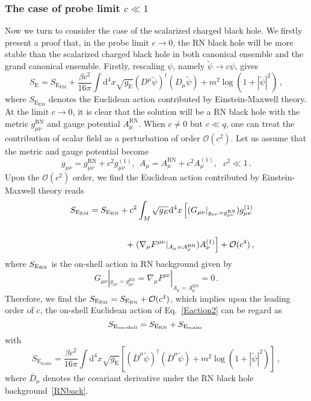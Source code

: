 \documentclass[pr, twocolumn, preprintnumbers, showpacs,footnoteadded, superscriptaddress,nofootinbib,longbibliography]{revtex4-1}
\newcommand{\td}{\mathrm{d}}
\begin{document}
\subsubsection{The case of probe limit $c \ll 1$}
Now we turn to consider the case of the scalarized charged black hole. We firstly present a proof that, in the probe limit $c \to 0$, the RN black hole will be more stable than the scalarized charged black hole in both canonical ensemble and the grand canonical ensemble. Firstly, rescaling $\psi$, namely $\tilde{\psi} \to c \psi$, gives
%
\begin{equation}\label{Eaction2}
 S_\text{E}=S_{\text{E}_{\text{EM}}}+\frac{\beta c^2}{16\pi}\int \td^4 x \sqrt{g_{\text{E}}} (D^ \mu \tilde{\psi})^{\dag}(D_\mu \tilde{\psi})+m^2 \log(1+|\tilde{\psi}|^2) \, ,
\end{equation}
%
where $S_{\text{E}_{\text{EM}}}$ denotes the Euclidean action contributed by Einstein-Maxwell theory.  At the limit $c \to 0$, it is clear that the solution will be a RN black hole with the metric $g_{\mu\nu}^{\text{RN}}$ and gauge potential $A_{\mu}^{\text{RN}}$. When $c\neq 0$ but $c\ll q$, one can treat the contribution of scalar field as a perturbation of order $\mathcal{O}(c^2)$. Let us assume that the metric and gauge potential become
%
\begin{equation}\label{metricas1}
  g_{\mu\nu}=g_{\mu\nu}^{\text{RN}}+c^2g_{\mu\nu}^{(1)},~~A_\mu=A_{\mu}^{\text{RN}}+c^2A_\mu^{(1)},~~~c^2\ll1\,.
\end{equation}
%
Upon the $\mathcal{O}(c^2)$ order, we find the Euclidean action contributed by Einstein-Maxwell theory reads
%
\begin{eqnarray}\label{actems1}
&& S_{\text{E}_{\text{EM}}}=S_{\text{E}_{\rm RN}}  + c^2\int_{M}\sqrt{g_E}\td^4x\left[(G_{\mu\nu}|_{g_{\mu\nu}=g_{\mu\nu}^{\text{RN}}})g_{\mu\nu}^{(1)} \right. \cr
~\cr
&&+ \left.(\nabla_{\mu}F^{\mu\nu}|_{A_\mu=A_{\mu}^{\text{RN}}})A_\nu^{(1)}\right]+\mathcal{O}(c^4)\,,
\end{eqnarray}
%
where $S_{\text{E}_{\rm RN}}$ is the on-shell action in RN background given by
%
\begin{equation}
G_{\mu\nu}|_{g_{\mu\nu}=g_{\mu\nu}^{\text{RN}}}=\nabla_{\mu}F^{\mu\nu}|_{A_\mu=A_{\mu}^{\text{RN}}}=0 \, .
\end{equation}
%
Therefore, we find the $S_{\text{E}_{\text{EM}}}=S_{\text{E}_{\rm RN}}+\mathcal{O}(c^4)$, which implies upon the leading order of $c$, the on-shell Euclidean action of Eq.~\eqref{Eaction2} can be regard as
%
\begin{equation} \label{Eaction3}
S_{\text{E}_{\text{on-shell}}}=S_{\text{E}_{ \rm RN}}+S_{\text{E}_\text{scalar}} \,
\end{equation}
%
with
%
\begin{equation} \label{Eaction3b}
S_{\text{E}_\text{scalar}}=\frac{\beta c^2}{16\pi}\int \td^4 x \sqrt{g_{\text{E}}}[ ( \bar{D}^ \mu \tilde{\psi})^{\dag}(\bar{D}^{\mu} \tilde{\psi})+m^2 \log(1+|\tilde{\psi}|^2)] \, ,
\end{equation}
%
where $\bar{D}_\mu $ denotes the covariant derivative under the RN black hole background~\eqref{RNback}.
\end{document}
